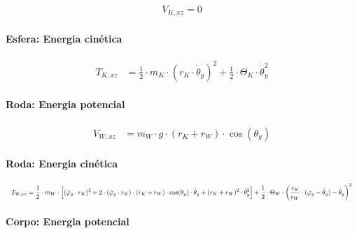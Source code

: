 \begin{equation*}
    \begin{aligned}
        V_{K,xz} = 0
    \end{aligned}
\end{equation*}

\paragraph{Esfera: Energia cinética}

\begin{equation*}
    \begin{aligned}
        T_{K,xz} & = \frac{1}{2} \cdot m_K \cdot (r_K \cdot \dot\theta_y)^2 + \frac{1}{2} \cdot \Theta_K \cdot \dot\theta_y^2
    \end{aligned}
\end{equation*}

\paragraph{Roda: Energia potencial}

\begin{equation*}
    \begin{aligned}
        V_{W,xz} & = m_W \cdot g \cdot (r_K + r_W) \cdot \cos{(\theta_y)}
    \end{aligned}
\end{equation*}

\paragraph{Roda: Energia cinética}

\begin{equation*}
    \scalebox{0.65}{$
    \begin{aligned}
        T_{W,xz} = \frac{1}{2} \cdot m_W \cdot \Big[ (\dot{\varphi}_y \cdot r_K)^2 
        + 2 \cdot (\dot{\varphi}_y \cdot r_K) \cdot (r_K + r_W) \cdot \cos(\theta_y) \cdot \dot{\theta}_y + (r_K + r_W)^2 \cdot \dot{\theta}_y^2 \Big] + \frac{1}{2} \cdot \Theta_W \cdot \bigg(\frac{r_K}{r_W} \cdot (\dot{\varphi}_y - \dot{\theta}_y) - \dot{\theta}_y \bigg)^2
    \end{aligned}
    $}
\end{equation*}

\paragraph{Corpo: Energia potencial}

